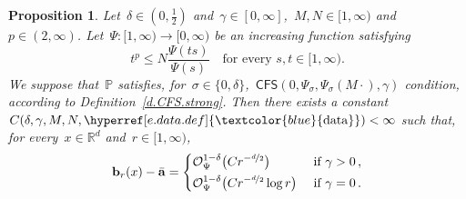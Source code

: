 \documentclass[11pt,twoside]{article} %
\numberwithin{equation}{section}
\newtheorem{proposition}[theorem]{Proposition}
\theoremstyle{definition}
\newcommand{\dataref}{\hyperref[e.data.def]{\textcolor{blue}{\ensuremath{\mathrm{data}}}}}
\let\originalleft\left
\let\originalright\right
\renewcommand{\left}{\mathopen{}\mathclose\bgroup\originalleft}
\renewcommand{\right}{\aftergroup\egroup\originalright}
\newcommand*{\R}{\ensuremath{\mathbb{R}}}
\renewcommand{\b}{\ensuremath{\mathbf{b}}}
\renewcommand{\a}{\mathbf{a}}
\newcommand{\ahom}{\bar{\a}}
\renewcommand{\P}{\mathbb{P}}
\renewcommand{\O}{\mathcal{O}}
\newcommand{\CFS}{\mathsf{CFS}}
\begin{document}
\begin{proposition} 
\label{p.psipsi.coarse.optimal}
Let~$\delta \in (0,\frac12)$ and~$\gamma \in [0,\infty]$,~$M,N \in [1,\infty)$ and~$p \in (2,\infty)$. 
Let~$\Psi:[1,\infty) \to [0,\infty)$ be an increasing function satisfying
\begin{equation}  \label{e.Psi.pgrowth.again}
t^p \leq N \frac{\Psi(t s)}{\Psi(s)}  \quad \mbox{for every~$s, t \in [1,\infty)$}. 
\end{equation} 
We suppose that~$\P$ satisfies, for~$\sigma \in \{0,\delta\}$,~$\CFS(0,\Psi_\sigma,\Psi_\sigma(M\cdot),\gamma)$ condition,  according to Definition~\ref{d.CFS.strong}. Then there exists a constant~$C(\delta,\gamma,M,N,\dataref) < \infty$ such that, for every~$x\in \R^d$ and~$r \in [1,\infty)$,
\begin{equation} 
\label{e.betazero}
\b_{r}(x)  - \ahom  
=  
\left\{
\begin{aligned}
& \O_{\Psi}^{1-\delta} \bigl(C r^{-\nicefrac d2}\bigr) & & \mbox{ if } \gamma>0
\, ,  
\\
& 
 \O_{\Psi}^{1-\delta} \bigl(C r^{-\nicefrac d2} \log r \bigr) & & \mbox{ if } \gamma = 0
\, .
\end{aligned}
\right.
\end{equation}
\end{proposition}
\end{document}
